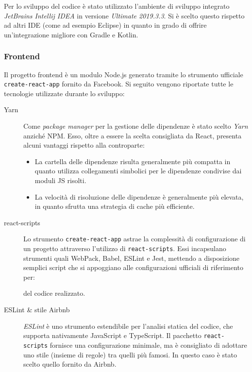       Per lo sviluppo del codice è stato utilizzato l'ambiente di sviluppo integrato \emph{JetBrains Intellij IDEA} in versione \emph{Ultimate 2019.3.3}.
      Si è scelto questo rispetto ad altri IDE (come ad esempio Eclipse) in quanto in grado di offrire un'integrazione migliore con Gradle e Kotlin.

    \subsubsection{Frontend}

      Il progetto frontend è un modulo Node.js generato tramite lo strumento ufficiale \texttt{create-react-app} fornito da Facebook.
      Si seguito vengono riportate tutte le tecnologie utilizzate durante lo sviluppo:

      \begin{description}
        \item[Yarn]
          Come \emph{package manager} per la gestione delle dipendenze è stato scelto \emph{Yarn} anziché NPM\@.
          Esso, oltre a essere la scelta consigliata da React, presenta alcuni vantaggi rispetto alla controparte:
          \begin{itemize}
            \item La cartella delle dipendenze risulta generalmente più compatta in quanto utilizza collegamenti simbolici per le dipendenze condivise dai moduli JS risolti.
            \item La velocità di risoluzione delle dipendenze è generalmente più elevata, in quanto sfrutta una strategia di cache più efficiente.
          \end{itemize}

        \item[react-scripts]
          Lo strumento \texttt{create-react-app} astrae la complessità di configurazione di un progetto attraverso l'utilizzo di \texttt{react-scripts}.
          Essi incapsulano strumenti quali WebPack, Babel, ESLint e Jest, mettendo a disposizione semplici script che si appoggiano alle configurazioni ufficiali di riferimento per:
          del codice realizzato.

        \item[ESLint \& stile Airbnb]
          \emph{ESLint} è uno strumento estendibile per l'analisi statica del codice, che supporta nativamente JavaScript e TypeScript.
          Il pacchetto \texttt{react-scripts} fornisce una configurazione minimale, ma è consigliato di adottare uno stile (insieme di regole) tra quelli più famosi.
          In questo caso è stato scelto quello fornito da Airbnb. %


\end{description}
